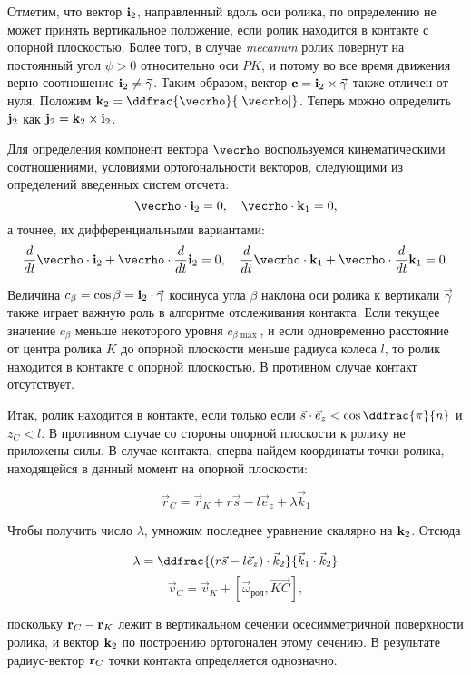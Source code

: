 Отметим, что вектор ${\bf i}_2$, направленный вдоль оси ролика, по определению не может принять вертикальное положение, если ролик находится в контакте с опорной плоскостью. Более того, в случае \textit{mecanum} ролик повернут на постоянный угол $\psi > 0$ относительно оси $PK$, и потому во все время движения верно соотношение ${\bf i}_2 \ne \vec{\gamma}$. Таким образом, вектор ${\bf c} = {\bf i}_2 \times \vec{\gamma}$ также отличен от нуля. Положим ${\bf k}_2 = \ddfrac{\vecrho}{|\vecrho|}$. Теперь можно определить ${\bf j}_2$ как ${\bf j}_2 = {\bf k}_2 \times {\bf i}_2$.

Для определения компонент вектора $\vecrho$ воспользуемся кинематическими соотношениями, условиями ортогональности векторов, следующими из определений введенных систем отсчета:
$$
    \vecrho \cdot {\bf i}_2 = 0, \quad \vecrho \cdot {\bf k}_1 = 0,
$$
а точнее, их дифференциальными вариантами:
$$
    \dfrac{d}{dt}\vecrho \cdot {\bf i}_2 + \vecrho \cdot \dfrac{d}{dt}{\bf i}_2 = 0,\quad
    \dfrac{d}{dt} \vecrho \cdot {\bf k}_1 + \vecrho \cdot \dfrac{d}{dt}{\bf k}_1 = 0.
$$

Величина $c_{\beta} = \cos\beta = {\bf i}_2 \cdot \vec{\gamma}$ косинуса угла $\beta$ наклона оси ролика к вертикали $\vec{\gamma}$ также играет важную роль в алгоритме отслеживания контакта. Если текущее значение $c_{\beta }$ меньше некоторого уровня $c_{\beta\max}$, и если одновременно расстояние от центра ролика $K$ до опорной плоскости меньше радиуса колеса $l$, то ролик находится в контакте с опорной плоскостью. В противном случае контакт отсутствует.

Итак, ролик находится в контакте, если только если $\vec{s} \cdot \vec{e}_z < \cos\ddfrac{\pi}{n} $ и $ z_C < l $. В противном случае со стороны опорной плоскости к ролику не приложены силы. В случае контакта, сперва найдем координаты точки ролика, находящейся в данный момент на опорной плоскости:

$$ \vec{r}_C = \vec{r}_K + r\vec{s} - l\vec{e}_z + \lambda\vec{k}_1 $$

Чтобы получить число $\lambda$, умножим последнее уравнение скалярно на ${\bf k}_2$. Отсюда

$$ \lambda = \ddfrac{\left(r\vec{s} - l\vec{e}_z\right)\cdot\vec{k}_2}{ \vec{k}_1\cdot\vec{k}_2} $$
$$ \vec{v}_C = \vec{v}_K + [ \vec{\omega}_{\text{рол}}, \overrightarrow{KC} ],$$

поскольку ${\bf r}_{C}-{\bf r}_{K}$ лежит в вертикальном сечении осесимметричной поверхности ролика, и вектор ${\bf k}_2$ по построению ортогонален этому сечению. В результате радиус-вектор ${\bf r}_{C}$ точки контакта определяется однозначно.

